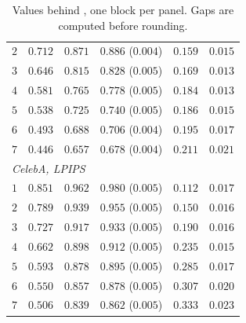 \begin{table}[htbp]
\begin{tabular}{r rr r rr}
        $2$ & $0.712$ & $0.871$ & $0.886$ ($0.004$) & $0.159$ & $0.015$ \\
        $3$ & $0.646$ & $0.815$ & $0.828$ ($0.005$) & $0.169$ & $0.013$ \\
        $4$ & $0.581$ & $0.765$ & $0.778$ ($0.005$) & $0.184$ & $0.013$ \\
        $5$ & $0.538$ & $0.725$ & $0.740$ ($0.005$) & $0.186$ & $0.015$ \\
        $6$ & $0.493$ & $0.688$ & $0.706$ ($0.004$) & $0.195$ & $0.017$ \\
        $7$ & $0.446$ & $0.657$ & $0.678$ ($0.004$) & $0.211$ & $0.021$ \\
        \midrule
        \multicolumn{6}{l}{\emph{CelebA, LPIPS}} \\
        $1$ & $0.851$ & $0.962$ & $0.980$ ($0.005$) & $0.112$ & $0.017$ \\
        $2$ & $0.789$ & $0.939$ & $0.955$ ($0.005$) & $0.150$ & $0.016$ \\
        $3$ & $0.727$ & $0.917$ & $0.933$ ($0.005$) & $0.190$ & $0.016$ \\
        $4$ & $0.662$ & $0.898$ & $0.912$ ($0.005$) & $0.235$ & $0.015$ \\
        $5$ & $0.593$ & $0.878$ & $0.895$ ($0.005$) & $0.285$ & $0.017$ \\
        $6$ & $0.550$ & $0.857$ & $0.878$ ($0.005$) & $0.307$ & $0.020$ \\
        $7$ & $0.506$ & $0.839$ & $0.862$ ($0.005$) & $0.333$ & $0.023$ \\
        \bottomrule
    \end{tabular}
    \caption{Values behind , one block per panel. Gaps are computed before rounding.}
    \label{tab:tightness}
\end{table}
